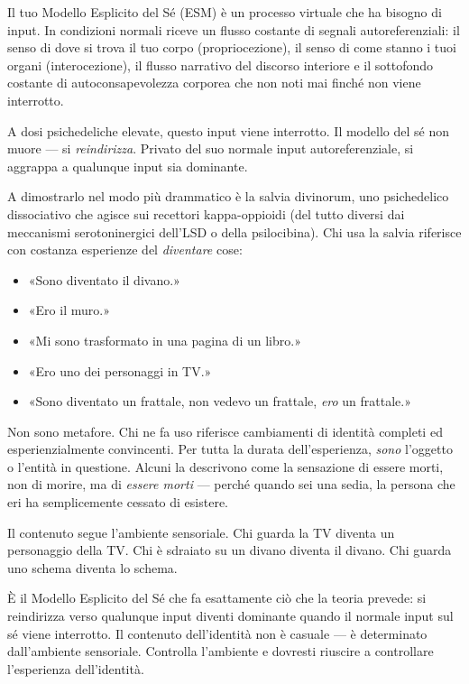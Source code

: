 \documentclass[11pt, twoside, openright]{book}
\begin{document}
Il tuo Modello Esplicito del Sé (ESM) è un processo virtuale che ha bisogno di input. In condizioni normali riceve un flusso costante di segnali autoreferenziali: il senso di dove si trova il tuo corpo (propriocezione), il senso di come stanno i tuoi organi (interocezione), il flusso narrativo del discorso interiore e il sottofondo costante di autoconsapevolezza corporea che non noti mai finché non viene interrotto.

A dosi psichedeliche elevate, questo input viene interrotto. Il modello del sé non muore --- si \textit{reindirizza}. Privato del suo normale input autoreferenziale, si aggrappa a qualunque input sia dominante.

A dimostrarlo nel modo più drammatico è la salvia divinorum, uno psichedelico dissociativo che agisce sui recettori kappa-oppioidi (del tutto diversi dai meccanismi serotoninergici dell'LSD o della psilocibina). Chi usa la salvia riferisce con costanza esperienze del \textit{diventare} cose:

\begin{itemize}
  \item «Sono diventato il divano.»
  \item «Ero il muro.»
  \item «Mi sono trasformato in una pagina di un libro.»
  \item «Ero uno dei personaggi in TV.»
  \item «Sono diventato un frattale, non vedevo un frattale, \textit{ero} un frattale.»
\end{itemize}

Non sono metafore. Chi ne fa uso riferisce cambiamenti di identità completi ed esperienzialmente convincenti. Per tutta la durata dell'esperienza, \textit{sono} l'oggetto o l'entità in questione. Alcuni la descrivono come la sensazione di essere morti, non di morire, ma di \textit{essere morti} --- perché quando sei una sedia, la persona che eri ha semplicemente cessato di esistere.

Il contenuto segue l'ambiente sensoriale. Chi guarda la TV diventa un personaggio della TV. Chi è sdraiato su un divano diventa il divano. Chi guarda uno schema diventa lo schema.

È il Modello Esplicito del Sé che fa esattamente ciò che la teoria prevede: si reindirizza verso qualunque input diventi dominante quando il normale input sul sé viene interrotto. Il contenuto dell'identità non è casuale --- è determinato dall'ambiente sensoriale. Controlla l'ambiente e dovresti riuscire a controllare l'esperienza dell'identità.
\end{document}
